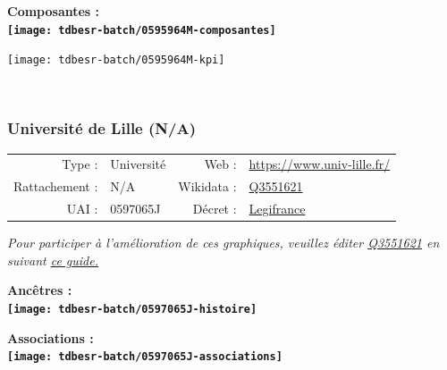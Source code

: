 \documentclass[12pt,french,]{article}
\begin{document}
\hrulefill

\begin{center} \bf Composantes : \\  
\texttt{[image: tdbesr-batch/0595964M-composantes]} \end{center}

\begin{center}\texttt{[image: tdbesr-batch/0595964M-kpi]} \end{center}\checkoddpage

\ifoddpage \fi ~\newpage  

\hypertarget{universituxe9-de-lille-na}{%
\subsubsection{Université de Lille
(N/A)}\label{universituxe9-de-lille-na}}

\begin{tabular*}{\textwidth}{rp{5cm}rl}  
\hline  
Type : & Université & Web : &\href{https://www.univ-lille.fr/}{https://www.univ-lille.fr/} \\  
Rattachement : & N/A & Wikidata : & \href{https://www.wikidata.org/entity/Q3551621}{Q3551621} \\  
UAI : & 0597065J & Décret : & \href{https://www.legifrance.gouv.fr/affichTexte.do?cidTexte=JORFTEXT000035543008}{Legifrance} \\  
\hline  
\end{tabular*}

\textit{\scriptsize Pour participer à l'amélioration de ces graphiques, veuillez éditer  \href{https://www.wikidata.org/entity/Q3551621}{Q3551621}  en suivant \href{https://github.com/cpesr/wikidataESR/blob/master/Rmd/wikidataESR.md}{ce guide.}}

\vspace{1cm}  
\begin{minipage}[b]{0.50\textwidth}\begin{center} \bf Ancêtres : \\  
\texttt{[image: tdbesr-batch/0597065J-histoire]} \end{center}\end{minipage}\begin{minipage}[b]{0.50\textwidth}\begin{center} \bf Associations : \\  
\texttt{[image: tdbesr-batch/0597065J-associations]} \end{center}\end{minipage}
\end{document}
